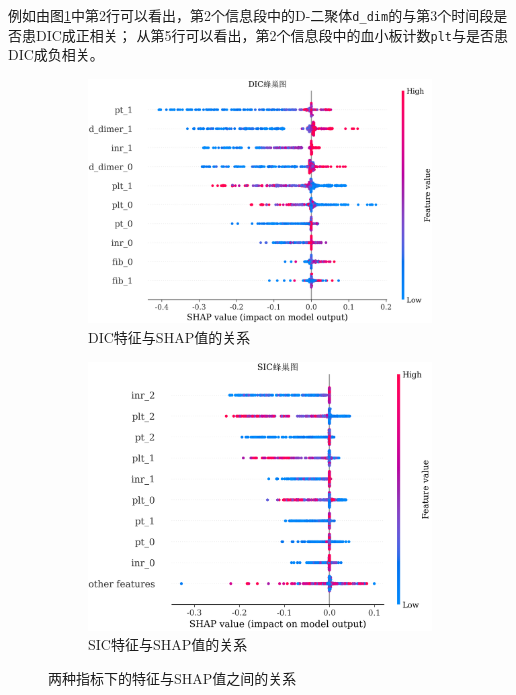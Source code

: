 \documentclass[12pt, a4paper, oneside]{ctexart}
\numberwithin{equation}{section}  %
\begin{document}
例如由图\ref{fig-shap-dic}中第2行可以看出，第2个信息段中的D-二聚体\texttt{d\_dim}的与第3个时间段是否患DIC成正相关；
从第5行可以看出，第2个信息段中的血小板计数\texttt{plt}与是否患DIC成负相关。
\begin{figure}[H]
   \hspace{-1.7cm}
   \begin{subfigure}[b]{0.55\textwidth}
       \includegraphics[scale=0.2]{SHAP/shap_dic_beeswarm}
       \caption{DIC特征与SHAP值的关系}
       \label{fig-shap-dic}
   \end{subfigure}
   \begin{subfigure}[b]{0.6\textwidth}
       \includegraphics[scale=0.2]{SHAP/shap_sic_beeswarm}
       \caption{SIC特征与SHAP值的关系}
   \end{subfigure}
   \caption{两种指标下的特征与SHAP值之间的关系}
   \label{fig-shap-total}
\end{figure}
\end{document}
